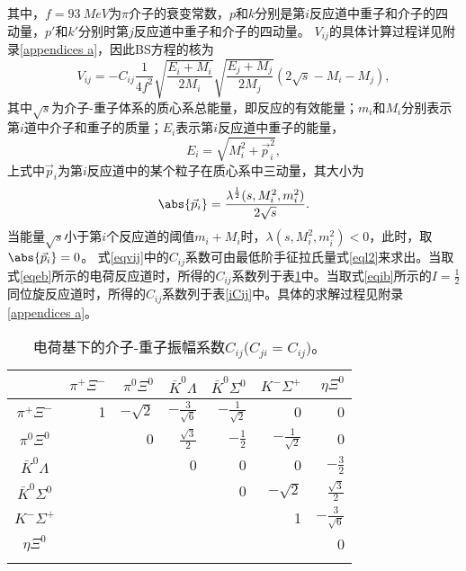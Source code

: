其中，$f=\SI{93}{MeV}$为$\pi$介子的衰变常数，$p$和$k$分别是第$i$反应道中重子和介子的四动量，$p'$和$k'$分别时第$j$反应道中重子和介子的四动量。
$V_{ij}$的具体计算过程详见附录\ref{appendices a}，因此BS方程的核为
\begin{equation}
	\label{eqvij}
	V_{ij}=-C_{ij}\frac{1}{4f^2}\sqrt{\frac{E_{i}+M_{i}}{2M_{i}}}\sqrt{\frac{E_{j}+M_{j}}{2M_{j}}}(2\sqrt{s}-M_{i}-M_{j}),
\end{equation}
其中$\sqrt{s}$为介子-重子体系的质心系总能量，即反应的有效能量；$m_{i}$和$M_{i}$分别表示第$i$道中介子和重子的质量；$E_{i}$表示第$i$反应道中重子的能量，
\begin{equation}
	E_{i}=\sqrt{M_{i}^2+\vec{p\,}_{i}^2},
\end{equation}
上式中$\vec{p}_{i}$为第$i$反应道中的某个粒子在质心系中三动量，其大小为
\begin{equation}
	\abs{\vec{p}_{i}}=\frac{\lambda^{\frac{1}{2}}(s,M_{i}^2,m_{i}^2)}{2\sqrt{s}}.
\end{equation}
当能量$\sqrt{s}$小于第$i$个反应道的阈值$m_{i}+M_{i}$时，$\lambda(s,M_{i}^2,m_{i}^2)<0$，此时，取$\abs{\vec{p}_{i}}=0$。
式\eqref{eqvij}中的$C_{ij}$系数可由最低阶手征拉氏量式\eqref{eql2}来求出。当取式\eqref{eqeb}所示的电荷反应道时，所得的$C_{ij}$系数列于表\ref{eCij}中。当取式\eqref{eqib}所示的$I=\frac{1}{2}$同位旋反应道时，所得的$C_{ij}$系数列于表\ref{iCij}中。具体的求解过程见附录\ref{appendices a}。
\begin{table}[ht]
\centering
\caption[电荷基下的介子-重子振幅系数$C_{ij}$]{电荷基下的介子-重子振幅系数$C_{ij}$($C_{ji}=C_{ij}$)。}
\label{eCij}
\begin{spacing}{1.5}
\setlength{\tabcolsep}{7mm}
\begin{tabular}{c|rrrrrr}
	\toprule
	\hline
	~ & $\pi^{+}\Xi^{-}$ &$\pi^{0}\Xi^{0}$& $\bar{K}^{0}\Lambda$ &$\bar{K}^{0}\Sigma^{0}$& $K^{-}\Sigma^{+}$ & $\eta\Xi^{0}$\\\hline
	$\pi^{+}\Xi^{-}$ & 1 & $-\sqrt{2}$ & $-\frac{3}{\sqrt{6}}$ &$-\frac{1}{\sqrt{2}}$&0&0 \\
	$\pi^{0}\Xi^{0}$ & ~ & 0 & $\frac{\sqrt{3}}{2}$ &$-\frac{1}{2}$& $-\frac{1}{\sqrt{2}}$&0 \\
	$\bar{K}^{0}\Lambda$ & ~ & ~ & 0 &0&0&$-\frac{3}{2}$ \\
	$\bar{K}^{0}\Sigma^{0}$ & ~ & ~ & ~ &0&$-\sqrt{2}$& $\frac{\sqrt{3}}{2}$ \\
	$K^{-}\Sigma^{+}$ & ~ & ~ & ~ &~&1& $-\frac{3}{\sqrt{6}}$ \\
	$\eta\Xi^{0}$ & ~ & ~ & ~ &~&~&0 \\
	\Xhline{1pt}
\end{tabular}
\end{spacing}
\end{table}
